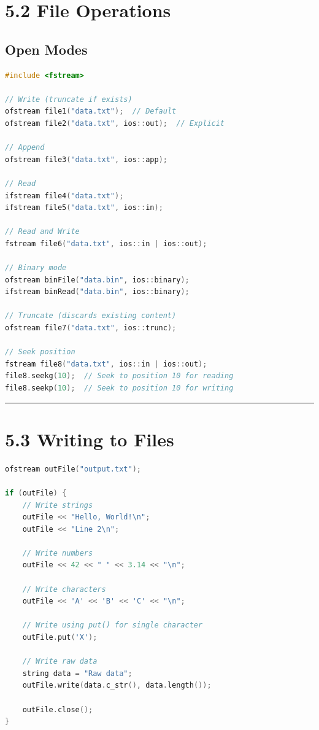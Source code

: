 \hypertarget{file-operations}{%
\section{5.2 File Operations}\label{file-operations}}

\hypertarget{open-modes}{%
\subsection{Open Modes}\label{open-modes}}

\begin{lstlisting}[language={C++}]
#include <fstream>

// Write (truncate if exists)
ofstream file1("data.txt");  // Default
ofstream file2("data.txt", ios::out);  // Explicit

// Append
ofstream file3("data.txt", ios::app);

// Read
ifstream file4("data.txt");
ifstream file5("data.txt", ios::in);

// Read and Write
fstream file6("data.txt", ios::in | ios::out);

// Binary mode
ofstream binFile("data.bin", ios::binary);
ifstream binRead("data.bin", ios::binary);

// Truncate (discards existing content)
ofstream file7("data.txt", ios::trunc);

// Seek position
fstream file8("data.txt", ios::in | ios::out);
file8.seekg(10);  // Seek to position 10 for reading
file8.seekp(10);  // Seek to position 10 for writing
\end{lstlisting}

\begin{center}\rule{0.5\linewidth}{0.5pt}\end{center}

\hypertarget{writing-to-files}{%
\section{5.3 Writing to Files}\label{writing-to-files}}

\begin{lstlisting}[language={C++}]
ofstream outFile("output.txt");

if (outFile) {
    // Write strings
    outFile << "Hello, World!\n";
    outFile << "Line 2\n";
    
    // Write numbers
    outFile << 42 << " " << 3.14 << "\n";
    
    // Write characters
    outFile << 'A' << 'B' << 'C' << "\n";
    
    // Write using put() for single character
    outFile.put('X');
    
    // Write raw data
    string data = "Raw data";
    outFile.write(data.c_str(), data.length());
    
    outFile.close();
}
\end{lstlisting}

